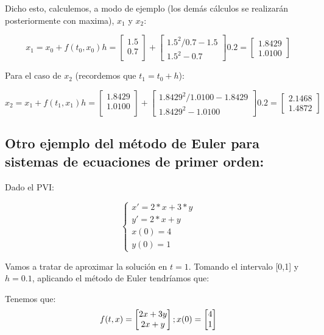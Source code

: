 \documentclass[12pt]{article}       %
\begin{document}
Dicho esto, calculemos, a modo de ejemplo (los demás cálculos se realizarán posteriormente con maxima), $x_1$ y $x_2$:

\begin{equation*}
x_1=x_0+f(t_0,x_0)h=\begin{bmatrix}
1.5\\
0.7\\
\end{bmatrix} + \begin{bmatrix}
1.5^2/0.7 - 1.5\\
1.5^2 - 0.7
\end{bmatrix}0.2=\begin{bmatrix}
1.8429\\
1.0100
\end{bmatrix}  
\end{equation*}

Para el caso de $x_2$ (recordemos que $t_1=t_0+h$):

\begin{equation*}
x_2=x_1+f(t_1,x_1)h=\begin{bmatrix}
1.8429\\
1.0100\\
\end{bmatrix} + \begin{bmatrix}
1.8429^2/1.0100 - 1.8429\\
1.8429^2 - 1.0100
\end{bmatrix}0.2=\begin{bmatrix}
2.1468\\
1.4872
\end{bmatrix}  
\end{equation*}

\subsection{Otro ejemplo del método de Euler para sistemas de ecuaciones de primer orden: }
Dado el PVI:

$$
\begin{cases}
x' = 2*x + 3 * y\\
y' = 2*x + y \\
x(0) = 4\\
y(0)=1
\end{cases}
$$

Vamos a tratar de aproximar la solución en $t=1$. Tomando el intervalo [0,1] y $h=0.1$, aplicando el método de Euler tendríamos que:



Tenemos que: \begin{equation*}
f(t,x)=\begin{bmatrix}
2x+3y \\
2x+y \\
\end{bmatrix};\\
x(0)=\begin{bmatrix}
4 \\
1
\end{bmatrix}
\end{equation*}
\end{document}

